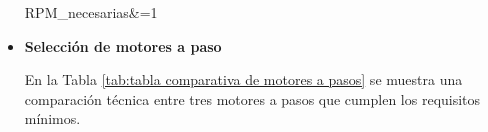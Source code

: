 \begin{itemize}
	\begin{myequation}\label{eq:calculo de rpms}
		\begin{split}
			RPM_{necesarias}&=1 \\
		\end{split}		
	\end{myequation}
		
	\item \textbf{Selección de motores a paso}
	
	
	
	En la Tabla \ref{tab:tabla comparativa de motores a pasos} se muestra una comparación técnica entre tres motores a pasos que cumplen los requisitos mínimos. 
	

\end{itemize}
